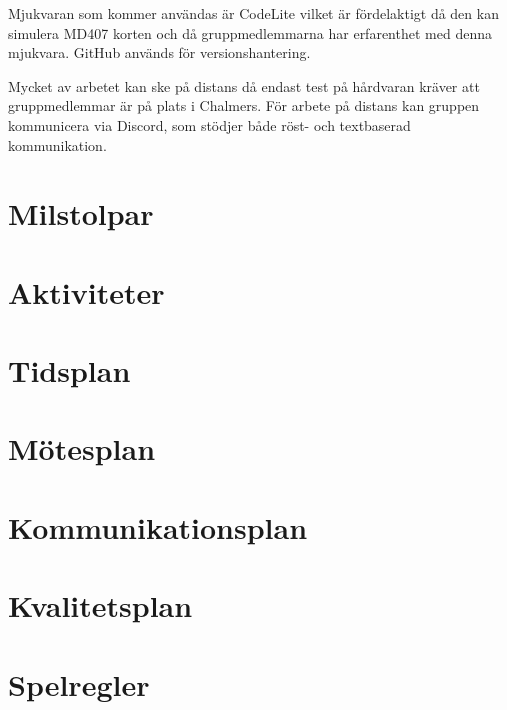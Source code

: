 \documentclass{article}
\begin{document}
Mjukvaran som kommer användas är CodeLite vilket är fördelaktigt då den kan simulera MD407 korten och då gruppmedlemmarna har erfarenthet med denna mjukvara. GitHub används för versionshantering.

Mycket av arbetet kan ske på distans då endast test på hårdvaran kräver att gruppmedlemmar är på plats i Chalmers. För arbete på distans kan gruppen kommunicera via Discord, som stödjer både röst- och textbaserad kommunikation.

\section{Milstolpar}

\section{Aktiviteter}

\section{Tidsplan}

\section{Mötesplan}

\section{Kommunikationsplan}

\section{Kvalitetsplan}

\section{Spelregler}
\end{document}
